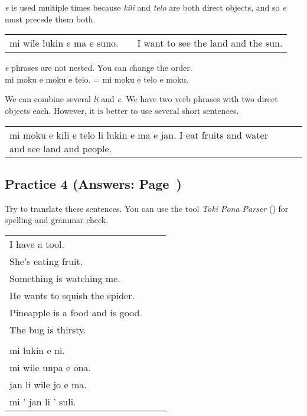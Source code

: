 \textit{e} is used multiple times because \textit{kili} and \textit{telo} are both direct objects, and so \textit{e} must precede them both. 

\begin{supertabular}{p{5,5cm}|ll}
mi wile lukin e ma e suno. && I want to see the land and the sun. \\
\end{supertabular} 
\textit{e} phrases are not nested. You can change the order. \\
mi moku e moku e telo. = mi moku e telo e moku. 

We can combine several \textit{li} and \textit{e}.
We have two verb phrases with two direct objects each. 
However, it is better to use several short sentences. 

\begin{supertabular}{p{5,5cm}|ll}
mi moku e kili e telo li lukin e ma e jan. I eat fruits and water and see land and people. \\
\end{supertabular} 
%
\newpage
\subsection*{Practice 4 (Answers: Page~\pageref{'direct_objects_compund_sentences'})}
%
Try to translate these sentences. 
You can use the tool \textit{Toki Pona Parser} (\cite{www:rowa:02}) for spelling and grammar check. 

\begin{supertabular}{p{5,5cm}|ll}
I have a tool. &&  \\ %
She's eating fruit. &&  \\ %
Something is watching me. &&  \\ %
He wants to squish the spider. &&  \\ %
Pineapple is a food and is good. &&  \\ %
The bug is thirsty. && \\ %
  && \\ %
mi lukin e ni. &&  \\ %
mi wile unpa e ona. &&   \\ %
jan li wile jo e ma. &&  \\ %
mi ' jan li ' suli. &&  \\ %
\end{supertabular} 

